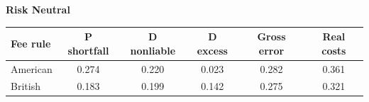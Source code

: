 \documentclass[10pt,border=5pt,varwidth=17cm]{standalone}
\begin{document}
\begingroup
\small
\setlength{\tabcolsep}{5pt}
\renewcommand{\arraystretch}{1.20}
\noindent\textbf{Risk Neutral}\par\smallskip
\noindent\begin{tabularx}{\linewidth}{@{}>{\raggedright\arraybackslash}Xccccc@{}}
\toprule
\textbf{Fee rule} & \textbf{P shortfall} & \textbf{D nonliable} & \textbf{D excess} & \textbf{Gross error} & \textbf{Real costs} \\
\midrule
American & 0.274 & 0.220 & 0.023 & 0.282 & 0.361 \\
British & 0.183 & 0.199 & 0.142 & 0.275 & 0.321 \\
\bottomrule\end{tabularx}\par\medskip
\endgroup
\end{document}
